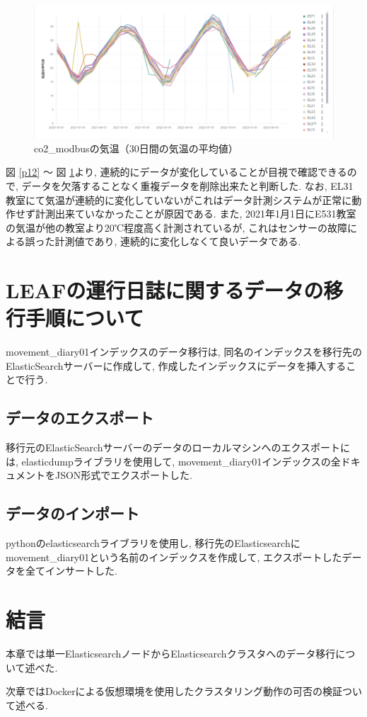 \begin{figure}[H]
  \hspace*{-2cm} %
  \centering %
  \includegraphics[width=170mm]{sotu/figure/temp.png}
  \caption{co2\_modbusの気温（30日間の気温の平均値）}
  \label{p14}
\end{figure}

図 \ref{p12} 〜 図 \ref{p14}より, 連続的にデータが変化していることが目視で確認できるので, データを欠落することなく重複データを削除出来たと判断した. なお, EL31教室にて気温が連続的に変化していないがこれはデータ計測システムが正常に動作せず計測出来ていなかったことが原因である. また, 2021年1月1日にE531教室の気温が他の教室より20℃程度高く計測されているが, これはセンサーの故障による誤った計測値であり, 連続的に変化しなくて良いデータである.


\section{LEAFの運行日誌に関するデータの移行手順について}

movement\_diary01インデックスのデータ移行は, 同名のインデックスを移行先のElasticSearchサーバーに作成して, 作成したインデックスにデータを挿入することで行う.

\subsection{データのエクスポート}
移行元のElasticSearchサーバーのデータのローカルマシンへのエクスポートには, elasticdumpライブラリを使用して, movement\_diary01インデックスの全ドキュメントをJSON形式でエクスポートした.

\subsection{データのインポート}
pythonのelasticsearchライブラリを使用し, 移行先のElasticsearchにmovement\_diary01という名前のインデックスを作成して, エクスポートしたデータを全てインサートした.

\section{結言}
本章では単一ElasticsearchノードからElasticsearchクラスタへのデータ移行について述べた.

次章ではDockerによる仮想環境を使用したクラスタリング動作の可否の検証ついて述べる.
